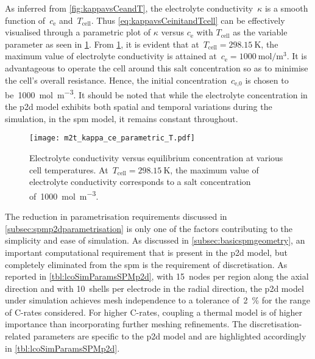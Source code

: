 As inferred from \cref{fig:kappavsCeandT}, the electrolyte conductivity~$\kappa$
is    a    smooth    function    of~$c_\text{e}$    and~$T_\text{cell}$.    Thus
\cref{eq:kappavsCeinitandTcell}   can  be   effectively  visualised   through  a
parametric  plot of  $\kappa$ versus  $c_\text{e}$ with  $T_\text{cell}$ as  the
variable parameter  as seen in \cref{fig:kappavsce}.  From \cref{fig:kappavsce},
it  is  evident   that  at~${T_\text{cell}=\SI{298.15}{\kelvin}}$,  the  maximum
value   of    electrolyte   conductivity    is   attained    at~${c_\text{e}   =
\SI{1000}{\mole\per\meter\cubed}}$.  It  is  advantageous to  operate  the  cell
around  this   salt  concentration  so   as  to  minimise  the   cell's  overall
resistance.  Hence, the  initial  concentration~$c_\text{e,0}$ is  chosen to  be~\SI{1000}{\mole\per\meter\cubed}. It should be  noted that while the electrolyte
concentration  in  the  \gls{p2d}  model  exhibits  both  spatial  and  temporal
variations during  the simulation, in  the \gls{spm} model, it  remains constant
throughout.

\begin{figure}[!htbp]
    \centering
    \texttt{[image: m2t\_kappa\_ce\_parametric\_T.pdf]}
    \caption[Electrolyte conductivity versus concentration at various cell
    temperatures]{Electrolyte conductivity versus equilibrium concentration at
        various cell temperatures. At~${T_\text{cell} = \SI{298.15}{\kelvin}}$,
        the maximum value of electrolyte conductivity corresponds to a salt
    concentration of~\SI{1000}{\mol\per\meter\cubed}.}
    \label{fig:kappavsce}
\end{figure}

The     reduction    in     parametrisation     requirements    discussed     in
\cref{subsec:spmp2dparametrisation}    is    only    one    of    the    factors
contributing  to  the  simplicity  and  ease  of  simulation.  As  discussed  in
\cref{subsec:basicspmgeometry}, an  important computational requirement  that is
present in the \gls{p2d} model, but  completely eliminated from the \gls{spm} is
the requirement of discretisation. As reported in \cref{tbl:lcoSimParamsSPMp2d},
with  15~nodes per  region  along the  axial direction  and  with 10~shells  per
electrode in the radial direction, the \gls{p2d} model under simulation achieves
mesh  independence  to  a  tolerance of~\approx\SI{2}{\percent}  for  the  range
of  C-rates  considered.  For  higher  C-rates,  coupling  a  thermal  model  is
of  higher  importance  than  incorporating  further  meshing  refinements.  The
discretisation-related parameters  are specific to  the \gls{p2d} model  and are
highlighted accordingly in \cref{tbl:lcoSimParamsSPMp2d}.

